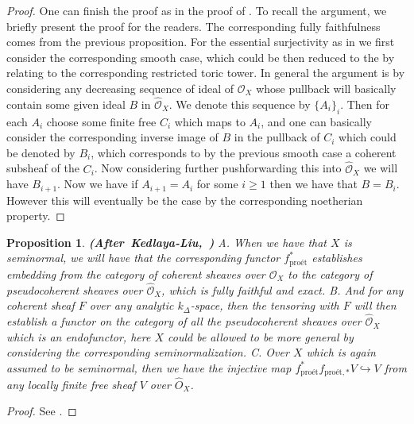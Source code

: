 \documentclass[12pt]{amsart}
\newtheorem{proposition}[theorem]{Proposition}
\theoremstyle{definition}
\numberwithin{equation}{section}
\begin{document}
\begin{proof}
One can finish the proof as in the proof of \cite[Lemma 8.2.8]{KL16}. To recall the argument, we briefly present the proof for the readers. The corresponding fully faithfulness comes from the previous proposition. For the essential surjectivity as in \cite[Lemma 8.2.8]{KL16} we first consider the corresponding smooth case, which could be then reduced to the \cite[Lemma 8.2.6]{KL16} by relating to the corresponding restricted toric tower. In general the argument is by considering any decreasing sequence of ideal of $\mathcal{O}_X$ whose pullback will basically contain some given ideal $B$ in $\widehat{\mathcal{O}}_X$. We denote this sequence by $\{A_i\}_i$. Then for each $A_i$ choose some finite free $C_i$ which maps to $A_i$, and one can basically consider the corresponding inverse image of $B$ in the pullback of $C_i$ which could be denoted by $B_i$, which corresponds to by the previous smooth case a coherent subsheaf of the $C_i$. Now considering further pushforwarding this into $\widehat{\mathcal{O}}_X$ we will have $B_{i+1}$. Now we have if $A_{i+1}=A_i$ for some $i\geq 1$ then we have that $B=B_i$. However this will eventually be the case by the corresponding noetherian property. 	
\end{proof}


\begin{proposition}\mbox{\bf{(After Kedlaya-Liu, \cite[Proposition 8.2.9, Corollary 8.2.10, Corollary 8.2.11]{KL16})}}
A. When we have that $X$ is seminormal, we will have that the corresponding functor $f^*_{\text{pro\'et}}$ establishes embedding from the category of coherent sheaves over $\mathcal{O}_X$ to the category of pseudocoherent sheaves over $\widehat{\mathcal{O}}_X$, which is fully faithful and exact. B. And for any coherent sheaf $F$ over any analytic $k_\Delta$-space, then the tensoring with $F$ will then establish a functor on the category of all the pseudocoherent sheaves over $\widehat{\mathcal{O}}_X$ which is an endofunctor, here $X$ could be allowed to be more general by considering the corresponding seminormalization. C. Over $X$ which is again assumed to be seminormal, then we have the injective map $f^*_{\text{pro\'et}}f_{\text{pro\'et},*}V\hookrightarrow V$ from any locally finite free sheaf $V$ over $\widehat{O}_X$.  	
\end{proposition}



\begin{proof}
See \cite[Proposition 8.2.9, Corollary 8.2.10, Corollary 8.2.11]{KL16}.	
\end{proof}
\end{document}
